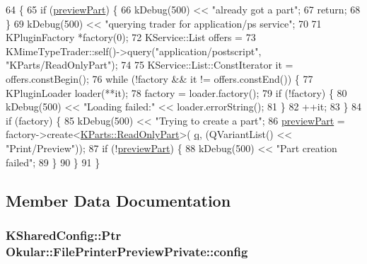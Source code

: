 \begin{DoxyCode}
64 \{
65     \textcolor{keywordflow}{if} (\hyperlink{classOkular_1_1FilePrinterPreviewPrivate_aa4c0056a7613427e946e5eaede65d432}{previewPart}) \{
66         kDebug(500) << \textcolor{stringliteral}{"already got a part"};
67         \textcolor{keywordflow}{return};
68     \}
69     kDebug(500) << \textcolor{stringliteral}{"querying trader for application/ps service"};
70 
71     KPluginFactory *factory(0);
72     KService::List offers =
73         KMimeTypeTrader::self()->query(\textcolor{stringliteral}{"application/postscript"}, \textcolor{stringliteral}{"KParts/ReadOnlyPart"});
74 
75     KService::List::ConstIterator it = offers.constBegin();
76     \textcolor{keywordflow}{while} (!factory && it != offers.constEnd()) \{
77         KPluginLoader loader(**it);
78         factory = loader.factory();
79         \textcolor{keywordflow}{if} (!factory) \{
80             kDebug(500) << \textcolor{stringliteral}{"Loading failed:"} << loader.errorString();
81         \}
82         ++it;
83     \}
84     \textcolor{keywordflow}{if} (factory) \{
85         kDebug(500) << \textcolor{stringliteral}{"Trying to create a part"};
86         \hyperlink{classOkular_1_1FilePrinterPreviewPrivate_aa4c0056a7613427e946e5eaede65d432}{previewPart} = factory->create<\hyperlink{classKParts_1_1ReadOnlyPart}{KParts::ReadOnlyPart}>(
      \hyperlink{classOkular_1_1FilePrinterPreviewPrivate_a56292691ae86eccc0845583b01002728}{q}, (QVariantList() << \textcolor{stringliteral}{"Print/Preview"}));
87         \textcolor{keywordflow}{if} (!\hyperlink{classOkular_1_1FilePrinterPreviewPrivate_aa4c0056a7613427e946e5eaede65d432}{previewPart}) \{
88             kDebug(500) << \textcolor{stringliteral}{"Part creation failed"};
89         \}
90     \}
91 \}
\end{DoxyCode}


\subsection{Member Data Documentation}
\hypertarget{classOkular_1_1FilePrinterPreviewPrivate_aa6b8b7d0af721ba3f6497c3a954c600b}{
\subsubsection[{config}]{\setlength{\rightskip}{0pt plus 5cm}K\+Shared\+Config\+::\+Ptr Okular\+::\+File\+Printer\+Preview\+Private\+::config}}\label{classOkular_1_1FilePrinterPreviewPrivate_aa6b8b7d0af721ba3f6497c3a954c600b}


